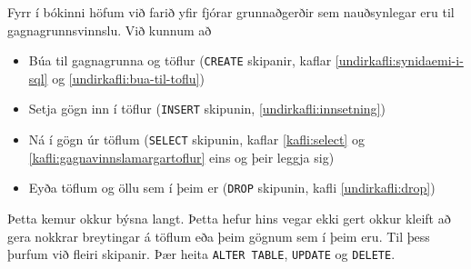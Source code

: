 Fyrr í bókinni höfum við farið yfir fjórar grunnaðgerðir sem nauðsynlegar eru til gagnagrunnsvinnslu. Við kunnum að
\begin{itemize}
 \item Búa til gagnagrunna og töflur (\verb|CREATE| skipanir, kaflar \ref{undirkafli:synidaemi-i-sql} og \ref{undirkafli:bua-til-toflu})
 \item Setja gögn inn í töflur (\verb|INSERT| skipunin, \ref{undirkafli:innsetning})
 \item Ná í gögn úr töflum (\verb|SELECT| skipunin, kaflar \ref{kafli:select} og \ref{kafli:gagnavinnslamargartoflur} eins og þeir leggja sig)
 \item Eyða töflum og öllu sem í þeim er (\verb|DROP| skipunin, kafli \ref{undirkafli:drop})
\end{itemize}
Þetta kemur okkur býsna langt. Þetta hefur hins vegar ekki gert okkur kleift að gera nokkrar breytingar á töflum eða þeim gögnum sem í þeim eru. Til þess þurfum við fleiri skipanir. Þær heita \verb|ALTER TABLE|, \verb|UPDATE| og \verb|DELETE|.

